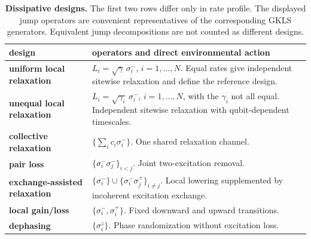 \begin{table}[!t]
\centering
\caption{\textbf{Dissipative designs.} The first two rows differ only in rate
profile. The displayed jump operators are convenient representatives of the
corresponding GKLS generators. Equivalent jump decompositions are not counted
as different designs.}
\label{tab:designs}
\footnotesize
\setlength{\tabcolsep}{3pt}
\renewcommand{\arraystretch}{1.06}
\begin{tabular}{@{}p{}p{}@{}}
\toprule
{\raggedright design\par}
& {\raggedright operators and direct environmental action\par}\tabularnewline
\midrule
{\raggedright\textbf{uniform local relaxation}~\cite{Sannia2024}\par}
& {\raggedright \(L_i=\sqrt{\gamma}\,\sigma_i^-\),
\(i=1,\ldots,N\). Equal rates give independent sitewise relaxation and define
the reference design.\par}\tabularnewline
{\raggedright\textbf{unequal local relaxation}\par}
& {\raggedright \(L_i=\sqrt{\gamma_i}\,\sigma_i^-\),
\(i=1,\ldots,N\), with the \(\gamma_i\) not all equal. Independent sitewise
relaxation with qubit-dependent timescales.\par}\tabularnewline
\midrule
{\raggedright\textbf{collective relaxation}\par}
& {\raggedright \(\{\sum_i c_i\sigma_i^-\}\). One shared relaxation
channel.\par}\tabularnewline
{\raggedright\textbf{pair loss}\par}
& {\raggedright \(\{\sigma_i^-\sigma_j^-\}_{i<j}\). Joint two-excitation
removal.\par}\tabularnewline
{\raggedright\textbf{exchange-assisted relaxation}\par}
& {\raggedright
\(\{\sigma_i^-\}\cup\{\sigma_i^-\sigma_j^+\}_{i\ne j}\). Local lowering
supplemented by incoherent excitation exchange.\par}\tabularnewline
{\raggedright\textbf{local gain/loss}\par}
& {\raggedright \(\{\sigma_i^-,\sigma_i^+\}\). Fixed downward and upward
transitions.\par}\tabularnewline
{\raggedright\textbf{dephasing}\par}
& {\raggedright \(\{\sigma_i^z\}\). Phase randomization without excitation
loss.\par}\tabularnewline
\bottomrule
\end{tabular}
\end{table}
\FloatBarrier
